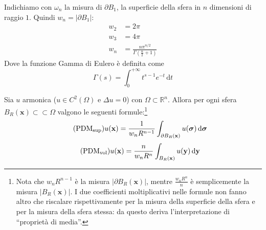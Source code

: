 \documentclass[10pt,a4paper,twoside,openright]{book}
\newcommand{\x}{\mathbf{x}}
\newcommand{\y}{\mathbf{y}}
\newcommand{\sigg}{\bm{\sigma}}
\newcommand{\de}{\,\mathrm d}
\newcommand{\dt}{\de t}
\newcommand{\dyy}{\de \y}
\newcommand{\dsig}{\de \sigg}
\begin{document}
Indichiamo con $\omega _{n}$ la misura di $\partial B_{1}$, la superficie della sfera in $n$ dimensioni di raggio $1$. Quindi $w_{n} =| \partial B_{1}| $:
\begin{align*}
    w_{2} & =2\pi                                                   \\
    w_{3} & =4\pi                                                   \\
    w_{n} & =\frac{n\pi ^{n/2}}{\Gamma \left(\frac{n}{2} +1\right)}
\end{align*}
Dove la funzione Gamma di Eulero è definita come
\begin{equation*}
    \Gamma (s) =\int ^{+\infty }_{0} t^{s-1} e^{-t} \dt
\end{equation*}
\begin{theorem}
    \label{thm:armonica-allora-pdm}
    Sia $u$ armonica ($u\in C^{2}(\Omega)$ e $\Delta u=0$) con $\Omega \subset \mathbb{R}^{n}$. Allora per ogni sfera $B_{R}(\x) \subset \subset \Omega $ valgono le seguenti formule:\footnote{Nota che $w_{n} R^{n-1}$ è la misura $| \partial B_{R}(\x)| $, mentre $\frac{w_{n} R^{n}}{n}$ è semplicemente la misura $| B_{R}(\x)| $. I due coefficienti moltiplicativi nelle formule non fanno altro che riscalare rispettivamente per la misura della superficie della sfera e per la misura della sfera stessa: da questo deriva l'interpretazione di ``proprietà di media''.}
    \begin{equation}
        \tag{PDM$_{\text{sup}}$}
        u(\x) =\frac{1}{w_{n} R^{n-1}}\int _{\partial B_{R}(\x)} u(\sigg) \dsig
        \label{eq:lap-prop-media-sup}
    \end{equation}
    \begin{equation}
        \tag{PDM$_{\text{vol}}$}
        u(\x) =\frac{n}{w_{n} R^{n}}\int _{B_{R}(\x)} u(\y) \dyy
        \label{eq:lap-prop-media-vol}
    \end{equation}
\end{theorem}
\end{document}
